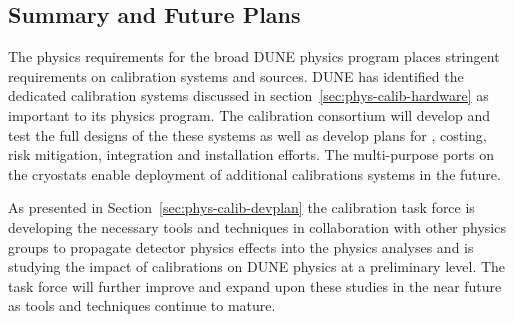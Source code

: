\subsection{Summary and Future Plans}
\label{sec:phys-calib-sum}


The physics requirements for the broad DUNE physics program places stringent requirements on calibration systems and sources. DUNE has identified the dedicated calibration systems discussed in section~\ref{sec:phys-calib-hardware} as important to its physics program. The calibration consortium will develop and test the full designs of the these systems as well as develop plans for , costing, risk mitigation, integration and installation efforts. The multi-purpose ports on the  cryostats enable deployment of additional calibrations systems in the future.

As presented in Section~\ref{sec:phys-calib-devplan} the calibration task force is developing the necessary tools and techniques in collaboration with other physics groups to propagate detector physics effects into the physics analyses and is studying the impact of calibrations on DUNE physics at a preliminary level. The task force will further improve and expand upon
these studies in the near future as tools and techniques continue to mature. 


